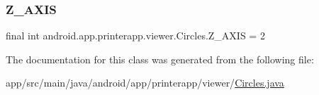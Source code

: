 \subsubsection{\texorpdfstring{Z\+\_\+\+A\+X\+IS}{Z\_AXIS}}
{\footnotesize\ttfamily final int android.\+app.\+printerapp.\+viewer.\+Circles.\+Z\+\_\+\+A\+X\+IS = 2\hspace{0.3cm}{\ttfamily [static]}}



The documentation for this class was generated from the following file\+:\begin{DoxyCompactItemize}
\item 
app/src/main/java/android/app/printerapp/viewer/\hyperlink{_circles_8java}{Circles.\+java}\end{DoxyCompactItemize}
